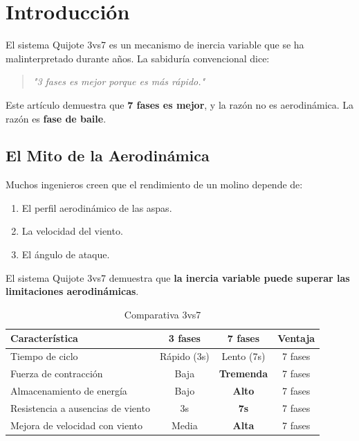 \documentclass[12pt,a4paper]{article}
\begin{document}
\tableofcontents
\newpage

\section{Introducción}

El sistema Quijote 3vs7 es un mecanismo de inercia variable que se ha malinterpretado durante años. La sabiduría convencional dice:

\begin{quote}
\textit{"3 fases es mejor porque es más rápido."}
\end{quote}

Este artículo demuestra que \textbf{7 fases es mejor}, y la razón no es aerodinámica. La razón es \textbf{fase de baile}.

\subsection{El Mito de la Aerodinámica}

Muchos ingenieros creen que el rendimiento de un molino depende de:

\begin{enumerate}
    \item El perfil aerodinámico de las aspas.
    \item La velocidad del viento.
    \item El ángulo de ataque.
\end{enumerate}

El sistema Quijote 3vs7 demuestra que \textbf{la inercia variable puede superar las limitaciones aerodinámicas}.

\begin{table}[H]
\centering
\caption{Comparativa 3vs7}
\label{tab:comparativa}
\begin{tabular}{@{}lccc@{}}
\toprule
\textbf{Característica} & \textbf{3 fases} & \textbf{7 fases} & \textbf{Ventaja} \\
\midrule
Tiempo de ciclo & Rápido (3s) & Lento (7s) & 7 fases \\
Fuerza de contracción & Baja & \textbf{Tremenda} & 7 fases \\
Almacenamiento de energía & Bajo & \textbf{Alto} & 7 fases \\
Resistencia a ausencias de viento & 3s & \textbf{7s} & 7 fases \\
Mejora de velocidad con viento & Media & \textbf{Alta} & 7 fases \\
\bottomrule
\end{tabular}
\end{table}
\end{document}
